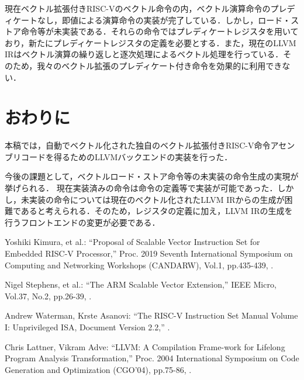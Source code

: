 ﻿\documentclass[a4j]{jarticle}
\begin{document}
現在ベクトル拡張付きRISC-Vのベクトル命令の内，ベクトル演算命令のプレディケートなし，即値による演算命令の実装が完了している．しかし，ロード・ストア命令等が未実装である．それらの命令ではプレディケートレジスタを用いており，新たにプレディケートレジスタの定義を必要とする．また，現在のLLVM IRはベクトル演算の繰り返しと逐次処理によるベクトル処理を行っている．そのため，我々のベクトル拡張のプレディケート付き命令を効果的に利用できない．

\section{おわりに}
本稿では，自動でベクトル化された独自のベクトル拡張付きRISC-V命令アセンブリコードを得るためのLLVMバックエンドの実装を行った．

今後の課題として，ベクトルロード・ストア命令等の未実装の命令生成の実現が挙げられる．
現在実装済みの命令は命令の定義等で実装が可能であった．しかし，未実装の命令については現在のベクトル化されたLLVM IRからの生成が困難であると考えられる．そのため，レジスタの定義に加え，LLVM IRの生成を行うフロントエンドの変更が必要である．


\begin{thebibliography}{9}
\vspace{-1mm}
\itemsep -1.7pt
{\footnotesize

{\small Yoshiki Kimura, et al.:      %
\newblock ``Proposal of Scalable Vector Instruction Set for Embedded RISC-V Processor,''
\newblock Proc. 2019 Seventh International Symposium on Computing and Networking Workshops (CANDARW),
\newblock Vol.1,
\newblock pp.435-439,
.}

{\small Nigel Stephens, et al.:      %
\newblock ``The ARM Scalable Vector Extension,''
\newblock IEEE Micro,
\newblock Vol.37,
\newblock No.2,
\newblock pp.26-39,
.}

{\small Andrew Waterman, Krste Asanovi:      %
\newblock ``The RISC-V Instruction Set Manual Volume I: Unprivileged ISA, Document Version 2.2,''
.}

{\small Chris Lattner, Vikram Adve:      %
\newblock ``LLVM: A Compilation Frame-work for Lifelong Program Analysis Transformation,''
\newblock Proc. 2004 International Symposium on Code Generation and Optimization (CGO’04),
\newblock pp.75-86,
.}

}

\end{thebibliography}
\end{document}
